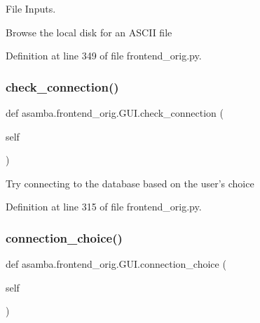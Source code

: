 File Inputs. 

\begin{DoxyVerb}Browse the local disk for an ASCII file \end{DoxyVerb}
 

Definition at line 349 of file frontend\+\_\+orig.\+py.

\mbox{\label{classasamba_1_1frontend__orig_1_1_g_u_i_ae71ecf0efcb575059e181ccd33f75178}} 
\subsubsection{\texorpdfstring{check\+\_\+connection()}{check\_connection()}}
{\footnotesize\ttfamily def asamba.\+frontend\+\_\+orig.\+G\+U\+I.\+check\+\_\+connection (\begin{DoxyParamCaption}\item[{}]{self }\end{DoxyParamCaption})}

\begin{DoxyVerb}Try connecting to the database based on the user's choice \end{DoxyVerb}
 

Definition at line 315 of file frontend\+\_\+orig.\+py.

\mbox{\label{classasamba_1_1frontend__orig_1_1_g_u_i_af3fdec98d1b3657658a5f489b2246c34}} 
\subsubsection{\texorpdfstring{connection\+\_\+choice()}{connection\_choice()}}
{\footnotesize\ttfamily def asamba.\+frontend\+\_\+orig.\+G\+U\+I.\+connection\+\_\+choice (\begin{DoxyParamCaption}\item[{}]{self }\end{DoxyParamCaption})}



